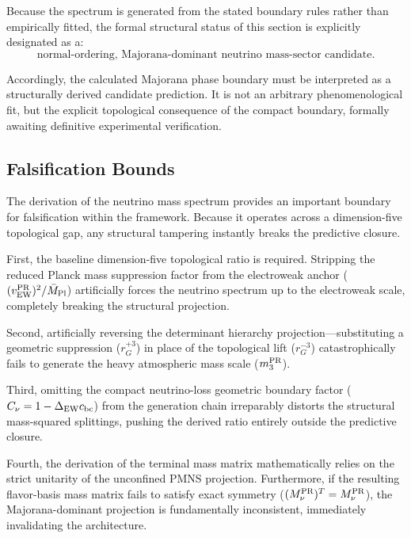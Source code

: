 \documentclass[11pt]{article}
\begin{document}
Because the spectrum is generated from the stated boundary rules rather than empirically fitted, the formal structural status of this section is explicitly designated as a:
\begin{equation}
\text{normal-ordering, Majorana-dominant neutrino mass-sector candidate}.
\end{equation}

Accordingly, the calculated Majorana phase boundary must be interpreted as a structurally derived candidate prediction. It is not an arbitrary phenomenological fit, but the explicit topological consequence of the compact boundary, formally awaiting definitive experimental verification.

\subsection{Falsification Bounds}
\label{sec:pr2_neutrino_negative_controls}

The derivation of the neutrino mass spectrum provides an important boundary for falsification within the framework. Because it operates across a dimension-five topological gap, any structural tampering instantly breaks the predictive closure.

First, the baseline dimension-five topological ratio is required. Stripping the reduced Planck mass suppression factor from the electroweak anchor ($(v_{\rm EW}^{\rm PR})^2 / \bar M_{\rm Pl}$) artificially forces the neutrino spectrum up to the electroweak scale, completely breaking the structural projection.

Second, artificially reversing the determinant hierarchy projection—substituting a geometric suppression ($r_G^{+3}$) in place of the topological lift ($r_G^{-3}$) catastrophically fails to generate the heavy atmospheric mass scale ($m_3^{\rm PR}$).

Third, omitting the compact neutrino-loss geometric boundary factor ($C_\nu = 1 - \Delta_{\rm EW}c_{\rm bc}$) from the generation chain irreparably distorts the structural mass-squared splittings, pushing the derived ratio entirely outside the predictive closure.

Fourth, the derivation of the terminal mass matrix mathematically relies on the strict unitarity of the unconfined PMNS projection. Furthermore, if the resulting flavor-basis mass matrix fails to satisfy exact symmetry ($(M_\nu^{\rm PR})^T = M_\nu^{\rm PR}$), the Majorana-dominant projection is fundamentally inconsistent, immediately invalidating the architecture.
\end{document}
